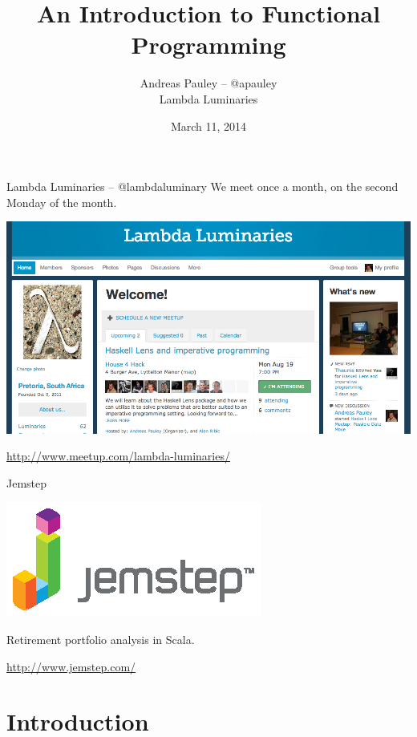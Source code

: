 \documentclass{beamer}
\title[Functional Programming]{An Introduction to Functional Programming}
\author{Andreas Pauley -- @apauley \\ Lambda Luminaries}
\institute{\href{http://www.meetup.com/DeveloperUG/events/139983502/}{DeveloperUG}}
\date{March 11, 2014}
\begin{document}
\begin{frame}
  \titlepage
\end{frame}

\begin{frame}{Lambda Luminaries -- @lambdaluminary}
  We meet once a month, on the second Monday of the month.
  \begin{center}
    \includegraphics[scale=0.3]{img/LambdaLuminariesScreenShot2013-08-09.png}
  \end{center}

  \vskip5mm

  \url{http://www.meetup.com/lambda-luminaries/}
\end{frame}

\begin{frame}{Jemstep}
  \begin{center}
    \includegraphics[scale=2]{img/Jemstep_HD_RGB.eps}
  \end{center}

  Retirement portfolio analysis in Scala.

  \vskip5mm

  \url{http://www.jemstep.com/}
\end{frame}

\section{Introduction}
\end{document}
